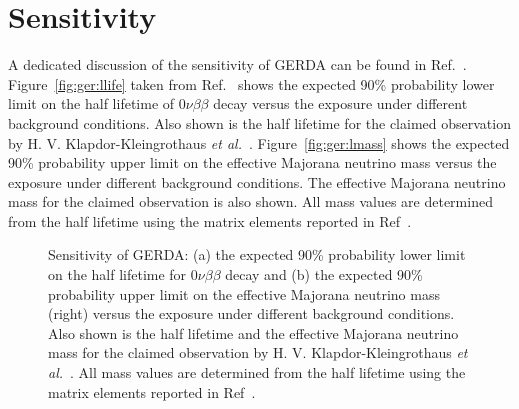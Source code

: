\section{Sensitivity}
\label{sec:gerda:sens}
A dedicated discussion of the sensitivity of GERDA can be found in Ref.~\cite{Cal06}. Figure~\ref{fig:ger:llife} taken from Ref.~\cite{Cal06} shows the expected 90\% probability lower limit on the half lifetime of $0\nu\beta\beta$ decay versus the exposure under different background conditions. Also shown is the half lifetime for the claimed observation by H. V. Klapdor-Kleingrothaus \textit{et   al.}~\cite{Hei04}. Figure~\ref{fig:ger:lmass} shows the expected 90\% probability upper limit on the effective Majorana neutrino mass versus the exposure under different background conditions. The effective Majorana neutrino mass for the claimed observation is also shown. All mass values are determined from the half lifetime using the matrix elements reported in Ref~\cite{Rod07}.
\begin{figure}[tbhp]
  \centering
  \hfil%
  \caption{Sensitivity of GERDA: (a) the expected 90\% probability     lower limit on the half lifetime for $0\nu\beta\beta$ decay and     (b) the expected 90\% probability upper limit on the effective     Majorana neutrino mass (right) versus the exposure under different     background conditions.  Also shown is the half lifetime and the     effective Majorana neutrino mass for the claimed observation by H.     V. Klapdor-Kleingrothaus \textit{et al.}~\cite{Hei04}. All mass     values are determined from the half lifetime using the matrix     elements reported in Ref~\cite{Rod07}.}
  \label{fig:gerda:limit}
\end{figure}

